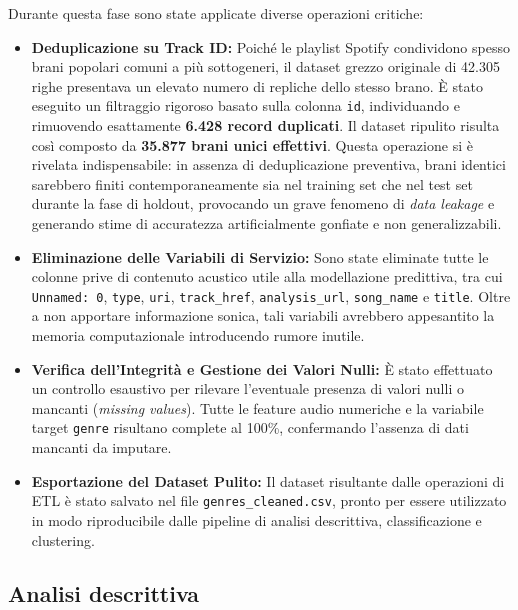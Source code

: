 Durante questa fase sono state applicate diverse operazioni critiche:

\begin{itemize}
    \item \textbf{Deduplicazione su Track ID:} Poiché le playlist Spotify condividono spesso brani popolari comuni a più sottogeneri, il dataset grezzo originale di 42.305 righe presentava un elevato numero di repliche dello stesso brano. È stato eseguito un filtraggio rigoroso basato sulla colonna \texttt{id}, individuando e rimuovendo esattamente \textbf{6.428 record duplicati}. Il dataset ripulito risulta così composto da \textbf{35.877 brani unici effettivi}. 
    Questa operazione si è rivelata indispensabile: in assenza di deduplicazione preventiva, brani identici sarebbero finiti contemporaneamente sia nel training set che nel test set durante la fase di holdout, provocando un grave fenomeno di \textit{data leakage} e generando stime di accuratezza artificialmente gonfiate e non generalizzabili.
    
    \item \textbf{Eliminazione delle Variabili di Servizio:} Sono state eliminate tutte le colonne prive di contenuto acustico utile alla modellazione predittiva, tra cui \texttt{Unnamed: 0}, \texttt{type}, \texttt{uri}, \texttt{track\_href}, \texttt{analysis\_url}, \texttt{song\_name} e \texttt{title}. Oltre a non apportare informazione sonica, tali variabili avrebbero appesantito la memoria computazionale introducendo rumore inutile.
    
    \item \textbf{Verifica dell'Integrità e Gestione dei Valori Nulli:} È stato effettuato un controllo esaustivo per rilevare l'eventuale presenza di valori nulli o mancanti (\textit{missing values}). Tutte le feature audio numeriche e la variabile target \texttt{genre} risultano complete al 100\%, confermando l'assenza di dati mancanti da imputare.
    
    \item \textbf{Esportazione del Dataset Pulito:} Il dataset risultante dalle operazioni di ETL è stato salvato nel file \texttt{genres\_cleaned.csv}, pronto per essere utilizzato in modo riproducibile dalle pipeline di analisi descrittiva, classificazione e clustering.
\end{itemize}

\newpage
\subsection{Analisi descrittiva}


